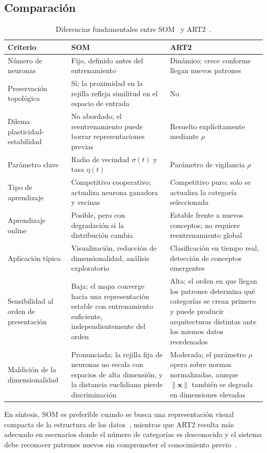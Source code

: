 \subsection*{Comparación}

\begin{table}[H]
\centering
\caption{Diferencias fundamentales entre SOM~\cite{kohonen1990som} y ART2~\cite{carpenter1987art2}.}
\label{tab:som_art}
\begin{tabular}{p{3.4cm} p{4.9cm} p{4.9cm}}
\toprule
\textbf{Criterio} & \textbf{SOM} & \textbf{ART2} \\
\midrule
Número de neuronas
  & Fijo, definido antes del entrenamiento
  & Dinámico; crece conforme llegan nuevos patrones \\[4pt]
Preservación topológica
  & Sí; la proximidad en la rejilla refleja similitud en el espacio de entrada
  & No \\[4pt]
Dilema plasticidad-estabilidad
  & No abordado; el reentrenamiento puede borrar representaciones previas
  & Resuelto explícitamente mediante $\rho$ \\[4pt]
Parámetro clave
  & Radio de vecindad $\sigma(t)$ y tasa $\eta(t)$
  & Parámetro de vigilancia $\rho$ \\[4pt]
Tipo de aprendizaje
  & Competitivo cooperativo; actualiza neurona ganadora y vecinas
  & Competitivo puro; solo se actualiza la categoría seleccionada \\[4pt]
Aprendizaje online
  & Posible, pero con degradación si la distribución cambia
  & Estable frente a nuevos conceptos; no requiere reentrenamiento global \\[4pt]
Aplicación típica
  & Visualización, reducción de dimensionalidad, análisis exploratorio
  & Clasificación en tiempo real, detección de conceptos emergentes \\[4pt]
Sensibilidad al orden de presentación
  & Baja; el mapa converge hacia una representación estable con entrenamiento suficiente, independientemente del orden
  & Alta; el orden en que llegan los patrones determina qué categorías se crean primero y puede producir arquitecturas distintas ante los mismos datos reordenados \\[4pt]
Maldición de la dimensionalidad
  & Pronunciada; la rejilla fija de neuronas no escala con espacios de alta dimensión, y la distancia euclidiana pierde discriminación~\cite{aggarwal2001surprising}
  & Moderada; el parámetro $\rho$ opera sobre normas normalizadas, aunque $\|\mathbf{x}\|$ también se degrada en dimensiones elevadas \\
\bottomrule
\end{tabular}
\end{table}

En síntesis, SOM es preferible cuando se busca una representación visual compacta de la estructura de los datos~\cite{kohonen1990som}, mientras que ART2 resulta más adecuado en escenarios donde el número de categorías es desconocido y el sistema debe reconocer patrones nuevos sin comprometer el conocimiento previo~\cite{carpenter1987art2,grossberg1987competitive}.